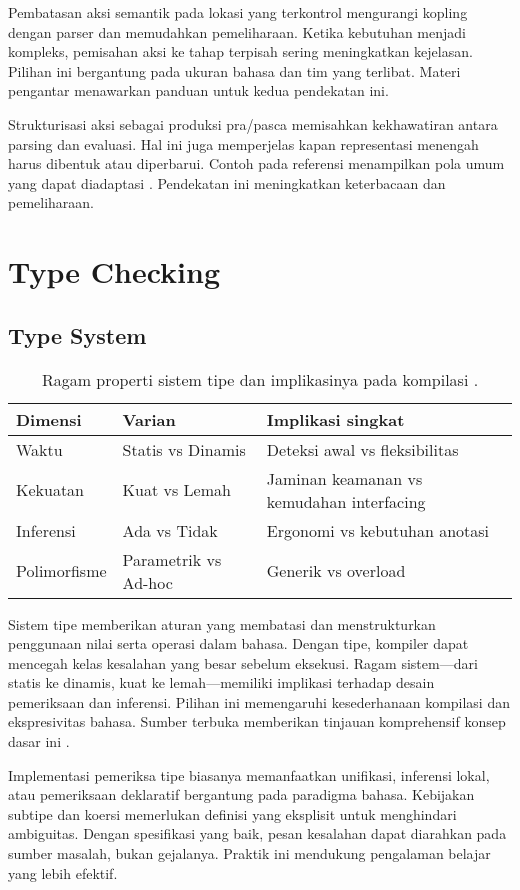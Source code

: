 \documentclass[../main.tex]{subfiles}
\begin{document}
Pembatasan aksi semantik pada lokasi yang terkontrol mengurangi kopling dengan parser dan memudahkan pemeliharaan. Ketika kebutuhan menjadi kompleks, pemisahan aksi ke tahap terpisah sering meningkatkan kejelasan. Pilihan ini bergantung pada ukuran bahasa dan tim yang terlibat. Materi pengantar menawarkan panduan untuk kedua pendekatan ini.

Strukturisasi aksi sebagai produksi pra/pasca memisahkan kekhawatiran antara parsing dan evaluasi. Hal ini juga memperjelas kapan representasi menengah harus dibentuk atau diperbarui. Contoh pada referensi menampilkan pola umum yang dapat diadaptasi \citep{WikiSDT}. Pendekatan ini meningkatkan keterbacaan dan pemeliharaan.

\section{Type Checking}
\subsection{Type System}
\begin{table}[t]
  \centering
  \caption{Ragam properti sistem tipe dan implikasinya pada kompilasi \citep{WikiTypeSystem}.}
  \label{tab:type-system}
  \begin{tabular}{@{}lll@{}}
    \toprule
    Dimensi & Varian & Implikasi singkat \\
    \midrule
    Waktu & Statis vs Dinamis & Deteksi awal vs fleksibilitas \\
    Kekuatan & Kuat vs Lemah & Jaminan keamanan vs kemudahan interfacing \\
    Inferensi & Ada vs Tidak & Ergonomi vs kebutuhan anotasi \\
    Polimorfisme & Parametrik vs Ad-hoc & Generik vs overload \\
    \bottomrule
  \end{tabular}
\end{table}
Sistem tipe memberikan aturan yang membatasi dan menstrukturkan penggunaan nilai serta operasi dalam bahasa. Dengan tipe, kompiler dapat mencegah kelas kesalahan yang besar sebelum eksekusi. Ragam sistem—dari statis ke dinamis, kuat ke lemah—memiliki implikasi terhadap desain pemeriksaan dan inferensi. Pilihan ini memengaruhi kesederhanaan kompilasi dan ekspresivitas bahasa. Sumber terbuka memberikan tinjauan komprehensif konsep dasar ini \citep{WikiTypeSystem}.

Implementasi pemeriksa tipe biasanya memanfaatkan unifikasi, inferensi lokal, atau pemeriksaan deklaratif bergantung pada paradigma bahasa. Kebijakan subtipe dan koersi memerlukan definisi yang eksplisit untuk menghindari ambiguitas. Dengan spesifikasi yang baik, pesan kesalahan dapat diarahkan pada sumber masalah, bukan gejalanya. Praktik ini mendukung pengalaman belajar yang lebih efektif.
\end{document}
